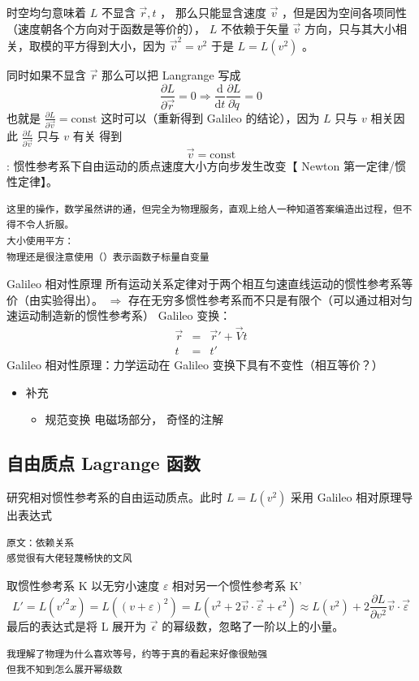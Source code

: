 \documentclass[11pt]{article}
\begin{document}
时空均匀意味着 \(L\) 不显含 \(\vec{r},t\) ， 那么只能显含速度 \(\vec{v}\) ，但是因为空间各项同性（速度朝各个方向对于函数是等价的）， \(L\) 不依赖于矢量 \(\vec{v}\) 方向，只与其大小相关，取模的平方得到大小，因为 \(\vec{v}^2=v^2\) 于是 \(L=L(v^2)\) 。

同时如果不显含 \(\vec{r}\) 那么可以把 Langrange 写成
\begin{equation}
\label{eq:10}
\frac{\partial L}{\partial \vec{r}}=0\Rightarrow \frac{\mathrm{d}}{\mathrm{d}t}\frac{\partial L}{\partial \dot{q}}=0
\end{equation}
也就是 \(\frac{\partial L}{\partial \vec{v}}=\mathrm{const}\)
这时可以（重新得到 Galileo 的结论），因为 \(L\) 只与 \(v\) 相关因此 \(\frac{\partial L}{\partial \vec{v}}\) 只与 \(v\) 有关
得到 $$\vec{v}=\mathrm{const}$$ :
惯性参考系下自由运动的质点速度大小方向步发生改变【 Newton 第一定律/惯性定律】。

\begin{verbatim}
这里的操作，数学虽然讲的通，但完全为物理服务，直观上给人一种知道答案编造出过程，但不得不令人折服。
大小使用平方：
物理还是很注意使用（）表示函数子标量自变量
\end{verbatim}



Galileo 相对性原理
所有运动关系定律对于两个相互匀速直线运动的惯性参考系等价（由实验得出）。 \(\Rightarrow\) 存在无穷多惯性参考系而不只是有限个（可以通过相对匀速运动制造新的惯性参考系）
Galileo 变换：
\begin{eqnarray}
\label{eq:5}
\vec{r} & = & \vec{r}'+\vec{V}t\\
t&=&t'
\end{eqnarray}
Galileo 相对性原理：力学运动在 Galileo 变换下具有不变性（相互等价？）

\begin{itemize}
\item 补充
\begin{itemize}
\item 规范变换
电磁场部分，
奇怪的注解
\end{itemize}
\end{itemize}

\subsection{自由质点 Lagrange 函数}
\label{sec:org09f723c}
研究相对惯性参考系的自由运动质点。此时 \(L=L(v^2)\)
采用 Galileo 相对原理导出表达式
\begin{verbatim}
原文：依赖关系
感觉很有大佬轻蔑畅快的文风
\end{verbatim}
取惯性参考系 K 以无穷小速度 \(\varepsilon\) 相对另一个惯性参考系 K'
\begin{equation}
\label{eq:11}
L'=L(v'^{2}x)=L((v+\varepsilon)^2)=L(v^2+2\vec{v}\cdot\vec{\varepsilon}+\epsilon^2)\approx L(v^2)+2 \frac{\partial L}{\partial v^2}\vec{v}\cdot\vec{\varepsilon}
\end{equation}
最后的表达式是将 L 展开为 \(\vec{\epsilon}\) 的幂级数，忽略了一阶以上的小量。
\begin{verbatim}
我理解了物理为什么喜欢等号，约等于真的看起来好像很勉强
但我不知到怎么展开幂级数
\end{verbatim}
\end{document}

